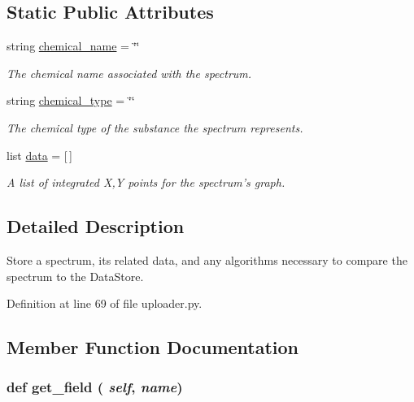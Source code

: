 \subsection*{Static Public Attributes}
\begin{DoxyCompactItemize}
\item 
string \hyperlink{classuploader_1_1_spectrum_transfer_aa1e794a67e21e2ca4e9c935115286ade}{chemical\_\-name} = \char`\"{}\char`\"{}
\begin{DoxyCompactList}\small\item\em The chemical name associated with the spectrum. \item\end{DoxyCompactList}\item 
string \hyperlink{classuploader_1_1_spectrum_transfer_ae46b0845841ed97a5c489a8e05cb2514}{chemical\_\-type} = \char`\"{}\char`\"{}
\begin{DoxyCompactList}\small\item\em The chemical type of the substance the spectrum represents. \item\end{DoxyCompactList}\item 
list \hyperlink{classuploader_1_1_spectrum_transfer_a018aaab493af92ea83348b0db6e32328}{data} = \mbox{[}$\,$\mbox{]}
\begin{DoxyCompactList}\small\item\em A list of integrated X,Y points for the spectrum's graph. \item\end{DoxyCompactList}\end{DoxyCompactItemize}


\subsection{Detailed Description}
\begin{DoxyVerb}Store a spectrum, its related data, and any algorithms necessary
to compare the spectrum to the DataStore.\end{DoxyVerb}
 

Definition at line 69 of file uploader.py.

\subsection{Member Function Documentation}
\hypertarget{classuploader_1_1_spectrum_transfer_af50426ecd14fc9667344dbf5407fb487}{
\subsubsection[{get\_\-field}]{\setlength{\rightskip}{0pt plus 5cm}def get\_\-field ( {\em self}, \/   {\em name})}}
\label{classuploader_1_1_spectrum_transfer_af50426ecd14fc9667344dbf5407fb487}


